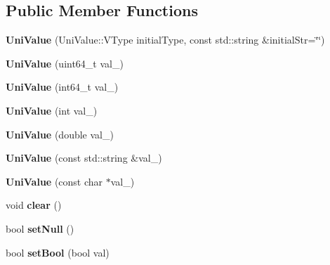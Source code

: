 \subsection*{Public Member Functions}
\begin{DoxyCompactItemize}
\item 
\mbox{\label{class_uni_value_a4745d05274d297cc29a60db6dbb9e327}} 
{\bfseries Uni\+Value} (Uni\+Value\+::\+V\+Type initial\+Type, const std\+::string \&initial\+Str=\char`\"{}\char`\"{})
\item 
\mbox{\label{class_uni_value_a0f9dfcd7460d60d6411b60c64049d37d}} 
{\bfseries Uni\+Value} (uint64\+\_\+t val\+\_\+)
\item 
\mbox{\label{class_uni_value_a8694292e69ccf3dfce68623c0c272f3d}} 
{\bfseries Uni\+Value} (int64\+\_\+t val\+\_\+)
\item 
\mbox{\label{class_uni_value_ae5a206a921a99b69e53260097b4a6130}} 
{\bfseries Uni\+Value} (int val\+\_\+)
\item 
\mbox{\label{class_uni_value_a725504a9df25d6e4b76486a60edf0f3b}} 
{\bfseries Uni\+Value} (double val\+\_\+)
\item 
\mbox{\label{class_uni_value_aee7fb67988278b142b7d3fa5816035ea}} 
{\bfseries Uni\+Value} (const std\+::string \&val\+\_\+)
\item 
\mbox{\label{class_uni_value_a29044aa7b41758774f15fbaa12e587af}} 
{\bfseries Uni\+Value} (const char $\ast$val\+\_\+)
\item 
\mbox{\label{class_uni_value_a3d941ccb4afeb53cb104939e91c6f599}} 
void {\bfseries clear} ()
\item 
\mbox{\label{class_uni_value_a9532075643c9c9876fd0f1b62fcc3f92}} 
bool {\bfseries set\+Null} ()
\item 
\mbox{\label{class_uni_value_afd5b112dc63426ca6b0a6137041e0809}} 
bool {\bfseries set\+Bool} (bool val)
\item 
\mbox{\label{class_uni_value_a073f2837ea47118d3be94360e3e93061}} 

\end{DoxyCompactItemize}

